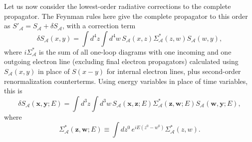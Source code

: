 Let us now consider the lowest-order radiative corrections to the complete
propagator. The Feynman rules here give the complete propagator to this order as
$S'_{\mathcal A}=S_{\mathcal A}+\delta S_{\mathcal A}$, with a correction term
\begin{equation}
 \delta S_{\mathcal A}(x,y)=\int d^4z\int d^4w\,
 S_{\mathcal A}(x,z)\Sigma^*_{\mathcal A}(z,w)S_{\mathcal A}(w,y),
 \tag{14.2.11}\label{eq:14.2.11}
\end{equation}
where $i\Sigma^*_{\mathcal A}$ is the sum of all one-loop diagrams with one
incoming and one outgoing electron line (excluding final electron propagators)
calculated using $S_{\mathcal A}(x,y)$ in place of $S(x-y)$ for internal
electron lines, plus second-order renormalization counterterms. Using energy
variables in place of time variables, this is
\begin{equation}
 \delta S_{\mathcal A}(\mathbf x,\mathbf y;E)=\int d^3z\int d^3w\,
 S_{\mathcal A}(\mathbf x,\mathbf z;E)\Sigma^*_{\mathcal A}(\mathbf z,\mathbf w;E)
 S_{\mathcal A}(\mathbf w,\mathbf y;E),
 \tag{14.2.12}\label{eq:14.2.12}
\end{equation}
where
\begin{equation}
 \Sigma^*_{\mathcal A}(\mathbf z,\mathbf w;E)
 \equiv\int dz^0\,e^{iE(z^0-w^0)}\Sigma^*_{\mathcal A}(z,w).
 \tag{14.2.13}\label{eq:14.2.13}
\end{equation}


